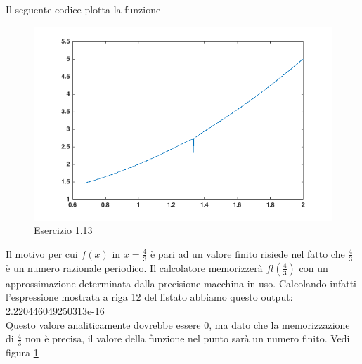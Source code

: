 Il seguente codice plotta la funzione \\

\begin{figure}
\includegraphics[width=\textwidth]{cap_1/es13/es13.png}
\caption{Esercizio 1.13}
\label{113}
\end{figure}
Il  motivo per cui $f(x)$ in $x=\frac{4}{3}$ è pari ad un valore finito risiede nel fatto che $\frac{4}{3}$ è un numero razionale periodico.
Il calcolatore memorizzerà $fl(\frac{4}{3})$ con un approssimazione determinata dalla precisione macchina in uso.
Calcolando infatti l'espressione mostrata a riga 12 del listato abbiamo questo output:\\   2.220446049250313e-16\\
Questo valore analiticamente dovrebbe essere 0, ma dato che la memorizzazione di $\frac{4}{3}$ non è precisa, il valore della funzione nel punto sarà un numero finito.
Vedi figura \ref{113}

